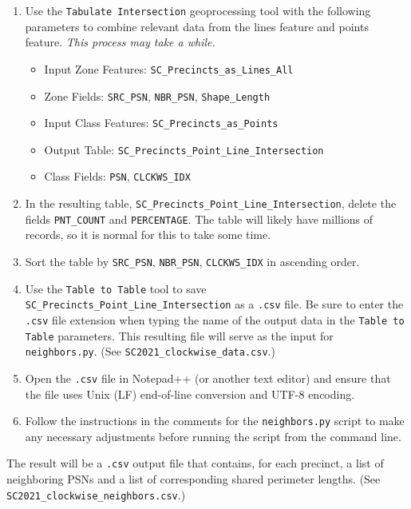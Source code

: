 \documentclass[11pt]{article}
\begin{document}
\begin{enumerate}
	\item Use the \verb|Tabulate Intersection| geoprocessing tool with the following parameters to combine relevant data from the lines feature and points feature. \textit{This process may take a while.}
	\begin{itemize}
		\item Input Zone Features: \verb|SC_Precincts_as_Lines_All|
		\item Zone Fields: \verb|SRC_PSN|, \verb|NBR_PSN|, \verb|Shape_Length|
		\item Input Class Features: \verb|SC_Precincts_as_Points|
		\item Output Table: \verb|SC_Precincts_Point_Line_Intersection|
		\item Class Fields: \verb|PSN|, \verb|CLCKWS_IDX|
	\end{itemize}
	
	\item In the resulting table, \verb|SC_Precincts_Point_Line_Intersection|, delete the fields \verb|PNT_COUNT| and \verb|PERCENTAGE|. The table will likely have millions of records, so it is normal for this to take some time.
	
	\item Sort the table by \verb|SRC_PSN|, \verb|NBR_PSN|, \verb|CLCKWS_IDX| in ascending order.
	
	\item Use the \verb|Table to Table| tool to save \verb|SC_Precincts_Point_Line_Intersection| as a \verb|.csv| file. Be sure to enter the \verb|.csv| file extension when typing the name of the output data in the \verb|Table to Table| parameters. This resulting file will serve as the input for \verb|neighbors.py|. (See \verb|SC2021_clockwise_data.csv|.)
	
	\item Open the \verb|.csv| file in Notepad++ (or another text editor) and ensure that the file uses Unix (LF) end-of-line conversion and UTF-8 encoding.
	
	\item Follow the instructions in the comments for the \verb|neighbors.py| script to make any necessary adjustments before running the script from the command line.
\end{enumerate}

The result will be a \verb|.csv| output file that contains, for each precinct, a list of neighboring PSNs and a list of corresponding shared perimeter lengths. (See \verb|SC2021_clockwise_neighbors.csv|.)
\end{document}
